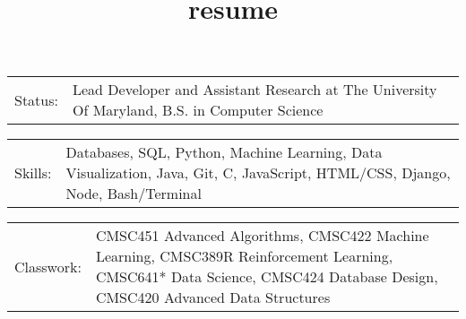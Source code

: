 \documentclass[10pt,a4paper]{article}
\title{resume}
\newcommand{\tzlarrow}{(0,0) -- (0.2,0) -- (0.3,0.2) -- (0.2,0.4) -- (0,0.4) -- (0.1,0.2) -- cycle;}
\newcommand{\larrow}[1]{
  \begin{tikzpicture}[scale=0.58]
    \filldraw[fill=#1!100,draw=#1!100!black]  \tzlarrow
  \end{tikzpicture}
}
\newcommand{\metasection}[2]{
  \begin{tabular*}{1\textwidth}{p{2.4cm} p{11cm}}
    \larrow{bgcol} \normalsize{\textcolor{sectcol}{#1}}&#2\\[1pt]
  \end{tabular*}
}
\begin{document}
\pagestyle{fancy}	


\vspace{-20pt}

\hspace{-0.25\linewidth}\colorbox{bgcol}{
}




\vspace{10pt}

\metasection{Status:}{Lead Developer and Assistant Research at The University Of Maryland, B.S. in Computer Science}
\metasection{Skills:}{Databases, SQL, Python, Machine Learning, Data Visualization, Java, Git, C, JavaScript, HTML/CSS, Django, Node, Bash/Terminal} 
\metasection{Classwork:}{CMSC451 Advanced Algorithms, CMSC422 Machine Learning, CMSC389R Reinforcement Learning, CMSC641* Data Science, CMSC424 Database Design, CMSC420 Advanced Data Structures}

\end{document}
